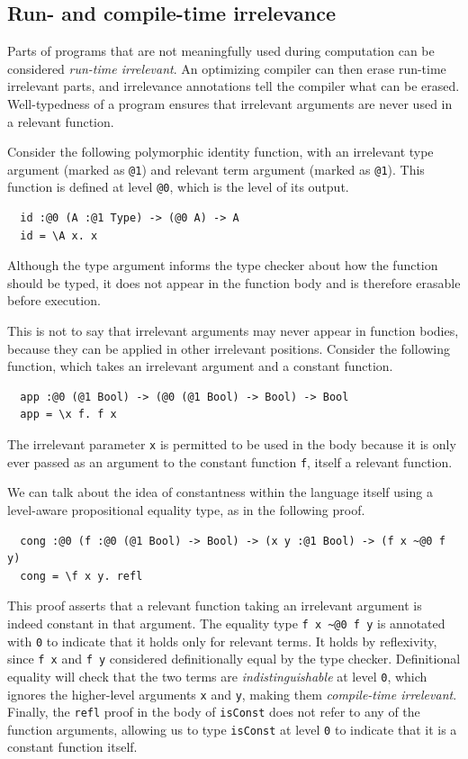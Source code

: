 \documentclass[acmsmall, screen=true, nonacm=true,
  review=\ifpublic false\else true\fi,
  anonymous=\ifanonymous true\else false\fi
]{acmart}
\begin{document}
\subsection{Run- and compile-time irrelevance}

Parts of programs that are not meaningfully used during computation
can be considered \emph{run-time irrelevant}.
An optimizing compiler can then erase run-time irrelevant parts,
and irrelevance annotations tell the compiler what can be erased.
Well-typedness of a program ensures that irrelevant arguments
are never used in a relevant function.

Consider the following polymorphic identity function,
with an irrelevant type argument (marked as \lstinline{@1})
and relevant term argument (marked as \lstinline{@1}). This 
function is defined at level \lstinline{@0}, which is the level of 
its output.

\begin{lstlisting}
  id :@0 (A :@1 Type) -> (@0 A) -> A
  id = \A x. x
\end{lstlisting}

Although the type argument informs the type checker about how the function should be typed,
it does not appear in the function body and is therefore erasable
before execution.

This is not to say that irrelevant arguments may never appear in function bodies,
because they can be applied in other irrelevant positions.
Consider the following function,
which takes an irrelevant argument and a constant function.

\begin{lstlisting}
  app :@0 (@1 Bool) -> (@0 (@1 Bool) -> Bool) -> Bool
  app = \x f. f x
\end{lstlisting}

The irrelevant parameter \lstinline{x} is permitted to be used in the body
because it is only ever passed as an argument to the constant function \lstinline{f},
itself a relevant function.

We can talk about the idea of constantness within the language itself
using a level-aware propositional equality type, as in the following proof.

\begin{lstlisting}
  cong :@0 (f :@0 (@1 Bool) -> Bool) -> (x y :@1 Bool) -> (f x ~@0 f y)
  cong = \f x y. refl
\end{lstlisting}

This proof asserts that a relevant function taking an irrelevant argument
is indeed constant in that argument.
The equality type \lstinline{f x ~@0 f y} is annotated with \lstinline{0}
to indicate that it holds only for relevant terms.
It holds by reflexivity, since \lstinline{f x} and \lstinline{f y}
considered definitionally equal by the type checker.
Definitional equality will check that the two terms are
\emph{indistinguishable} at level \lstinline{0},
which ignores the higher-level arguments \lstinline{x} and \lstinline{y},
making them \emph{compile-time irrelevant}.
Finally, the \lstinline{refl}
proof in the body of \lstinline{isConst} does not refer to any of the
function arguments, allowing us to type \lstinline{isConst} at level
\lstinline{0} to indicate that it is a constant function itself.
\end{document}
